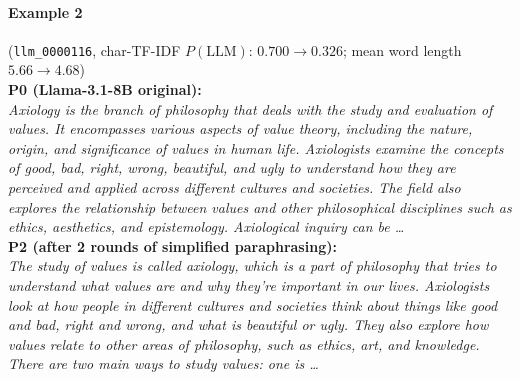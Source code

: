 \paragraph{Example 2} (\texttt{llm_0000116}, char-TF-IDF $P(\mathrm{LLM})$: $\mathbf{0.700}\to\mathbf{0.326}$; mean word length $\mathbf{5.66}\to\mathbf{4.68}$)\\
\noindent\textbf{P0 (Llama-3.1-8B original):}\\
\emph{Axiology is the branch of philosophy that deals with the study and evaluation of values. It encompasses various aspects of value theory, including the nature, origin, and significance of values in human life. Axiologists examine the concepts of good, bad, right, wrong, beautiful, and ugly to understand how they are perceived and applied across different cultures and societies. The field also explores the relationship between values and other philosophical disciplines such as ethics, aesthetics, and epistemology. Axiological inquiry can be \ldots}\\[0.3em]
\noindent\textbf{P2 (after 2 rounds of simplified paraphrasing):}\\
\emph{The study of values is called axiology, which is a part of philosophy that tries to understand what values are and why they're important in our lives. Axiologists look at how people in different cultures and societies think about things like good and bad, right and wrong, and what is beautiful or ugly. They also explore how values relate to other areas of philosophy, such as ethics, art, and knowledge. There are two main ways to study values: one is \ldots}\\[0.7em]

